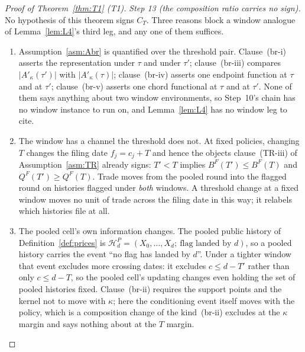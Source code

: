 \documentclass[11pt]{article}
\newcommand{\Akap}{A'_{\kappa}}
\begin{document}
\begin{proof}[Proof of Theorem~\ref{thm:T1} (T1)]
\emph{Step 13 (the composition ratio carries no sign).} No hypothesis of this theorem signs $C_T$.
Three reasons block a window analogue of Lemma~\ref{lem:L4}'s third leg, and any one of them
suffices.
\begin{enumerate}[label=(\roman*),leftmargin=2.4em,itemsep=3pt]
\item Assumption~\ref{asm:Abr} is quantified over the threshold pair. Clause~(br-i) asserts the
  representation under $\tau$ and under $\tau'$; clause~(br-iii) compares $\lvert\Akap(\tau')\rvert$
  with $\lvert\Akap(\tau)\rvert$; clause~(br-iv) asserts one endpoint function at $\tau$ and at
  $\tau'$; clause~(br-v) asserts one chord functional at $\tau$ and at $\tau'$. None of them says
  anything about two window environments, so Step~10's chain has no window instance to run on, and
  Lemma~\ref{lem:L4} has no window leg to cite.
\item The window has a channel the threshold does not. At fixed policies, changing $T$ changes the
  filing date $f_j = c_j + T$ and hence the objects clause~(TR-iii) of Assumption~\ref{asm:TR}
  already signs: $T' < T$ implies $B^F(T') \le B^F(T)$ and $Q^F(T') \ge Q^F(T)$. Trade moves from
  the pooled round into the flagged round on histories flagged under \emph{both} windows. A
  threshold change at a fixed window moves no unit of trade across the filing date in this way; it
  relabels which histories file at all.
\item The pooled cell's own information changes. The pooled public history of
  Definition~\ref{def:prices} is $\mathcal H_d^P = (X_0,\dots,X_d;\ \text{flag landed by }d)$, so a
  pooled history carries the event ``no flag has landed by $d$''. Under a tighter window that event
  excludes more crossing dates: it excludes $c \le d - T'$ rather than only $c \le d - T$, so
  the pooled cell's updating changes even holding the set of pooled histories fixed. Clause~(br-ii)
  requires the support points and the kernel not to move with $\kappa$; here the conditioning event
  itself moves with the policy, which is a composition change of the kind~(br-ii) excludes at the
  $\kappa$ margin and says nothing about at the $T$ margin.
\end{enumerate}


\end{proof}
\end{document}
